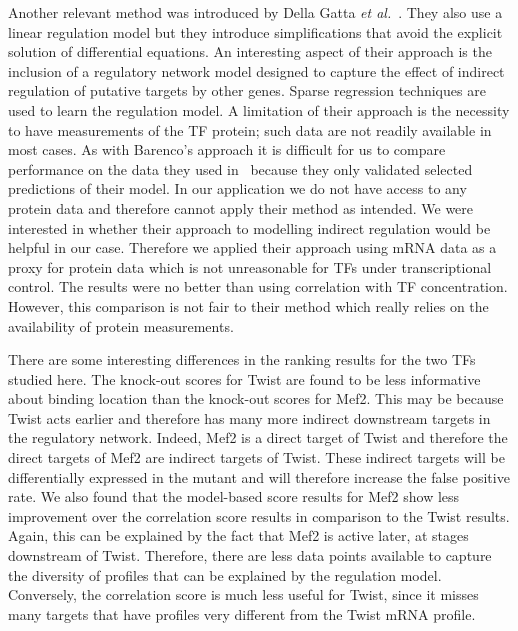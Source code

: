 \documentclass{pnastwo}
\begin{document}
\begin{article}
Another relevant method was introduced by Della Gatta {\em et
  al.}~\cite{Gatta2008}. They also use a linear regulation model but
they introduce simplifications that avoid the explicit solution of
differential equations. An interesting aspect of their approach is the
inclusion of a regulatory network model designed to capture the effect
of indirect regulation of putative targets by other genes. Sparse regression
techniques are used to learn the regulation model. A limitation of
their approach is the necessity to have measurements of the TF
protein; such data are not readily available in most cases. As with
Barenco's approach it is difficult for us to compare performance on
the data they used in~\cite{Gatta2008} because they only validated
selected predictions of their model. In our application we do not have
access to any protein data and therefore cannot apply their method as
intended. We were interested in whether
their approach to modelling indirect regulation would be helpful in
our case. Therefore we applied their approach using mRNA data as a
proxy for protein data which is not unreasonable for TFs under
transcriptional control. The results were no better than
using correlation with TF concentration. However, this comparison is
not fair to their method which really relies on the
availability of protein measurements.

There are some interesting differences in the ranking results for the two TFs studied
here. The knock-out scores for Twist are found to be less informative
about binding location than the knock-out scores for Mef2. This may be
because Twist acts earlier and therefore has many more indirect
downstream targets in the regulatory network. Indeed, Mef2 is a
direct target of Twist and therefore the direct targets of Mef2 are
indirect targets of Twist. These indirect targets will be
differentially expressed in the mutant and will therefore increase the
false positive rate. We also found that the model-based score results
for Mef2 show less improvement over the correlation score results in comparison to the Twist
results. Again, this can be explained by the fact that Mef2 is
active later, at stages downstream of Twist.
Therefore, there
are less data points available to capture the diversity of profiles
that can be explained by the regulation model. Conversely, the
correlation score is much less useful for Twist, since it misses many
targets that have profiles very different from the Twist mRNA
profile. 


\end{article}
\end{document}
